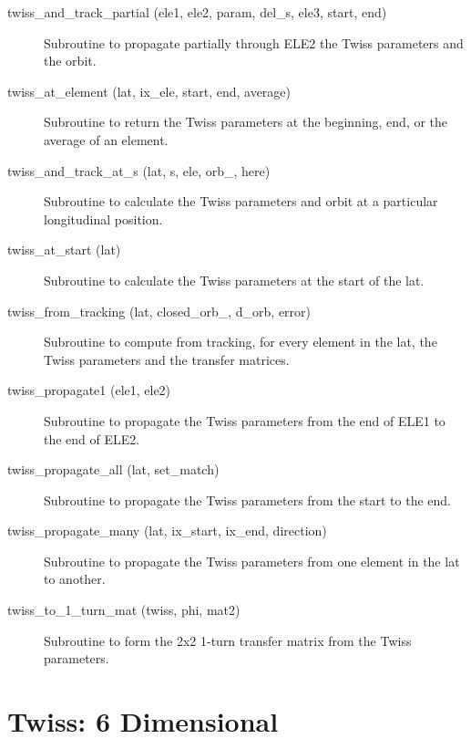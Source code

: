 \begin{description}
\item[twiss_and_track_partial (ele1, ele2, param, del_s, ele3, start, end)] \Newline
Subroutine to propagate partially through ELE2 the Twiss parameters and the orbit. 

\item[twiss_at_element (lat, ix_ele, start, end, average)] \Newline
Subroutine to return the Twiss parameters at the beginning, end, or the average of an element. 

\item[twiss_and_track_at_s (lat, s, ele, orb_, here)] \Newline
Subroutine to calculate the Twiss parameters and orbit at a particular longitudinal position. 

\item[twiss_at_start (lat)] \Newline
Subroutine to calculate the Twiss parameters at the start of the lat. 

\item[twiss_from_tracking (lat, closed_orb_, d_orb, error)] \Newline
Subroutine to compute from tracking, for every element in the lat, 
the Twiss parameters and the transfer matrices. 

\item[twiss_propagate1 (ele1, ele2)] \Newline
Subroutine to propagate the Twiss parameters from the end of ELE1 to the end of ELE2. 

\item[twiss_propagate_all (lat, set_match)] \Newline
Subroutine to propagate the Twiss parameters from the start to the end. 

\item[twiss_propagate_many (lat, ix_start, ix_end, direction)] \Newline
Subroutine to propagate the Twiss parameters from one element in the lat to another. 

\item[twiss_to_1_turn_mat (twiss, phi, mat2)] \Newline
Subroutine to form the 2x2 1-turn transfer matrix from the Twiss parameters. 

\end{description}

\section{Twiss: 6 Dimensional}
\label{r:twiss6}    

